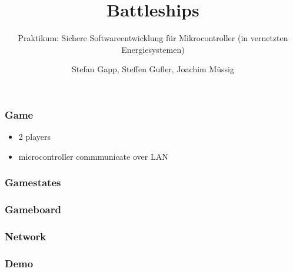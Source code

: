 \documentclass[handout]{beamer}
\title{Battleships}
\subtitle{Praktikum: Sichere Softwareentwicklung f\"ur Mikrocontroller (in vernetzten Energiesystemen)}
\author{Stefan Gapp, Steffen Gufler, Joachim M\"ussig}
\institute[\raisebox{-3.5mm}{\texttt{[image: Bilder/Zlogo]}}]
  {KITCTF}
\begin{document}
\begin{frame}
  \maketitle
\end{frame}

\begin{frame}
	\frametitle{Game}
	\begin{itemize}
		\item 2 players
		\item microcontroller commmunicate over LAN
	\end{itemize}
\end{frame}

\begin{frame}
	\frametitle{Gamestates}
\end{frame}

\begin{frame}
	\frametitle{Gameboard}
\end{frame}

\begin{frame}
	\frametitle{Network}
\end{frame}

\begin{frame}
	\frametitle{Demo}
\end{frame}
\end{document}

